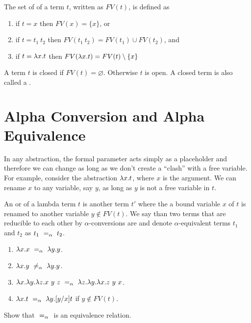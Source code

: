 \begin{definition}
\label{def:lce::fv}
The set of  of a term $t$, written as $FV(t)$,
is defined as 
\begin{enumerate}
\item if $t = x$ then $FV(x) = \{ x \}$, or
\item if $t = t_1~t_2$ then $FV(t_1~t_2)=FV(t_1) \cup FV(t_2)$, and
\item if $t = \lambda x. t$ then $FV(\lambda x.t)=FV(t) \setminus \{x\}$
\end{enumerate}
\end{definition}

\begin{definition}
\label{def:lce::open-closed}
A term $t$ is closed if $FV(t) = \varnothing$. Otherwise $t$ is open. 
A closed term is also called a .
\end{definition}


\section{Alpha Conversion and Alpha Equivalence}
\label{sec:lce::alpha}
In any abstraction, the formal parameter acts simply as a placeholder and therefore we can change as long as we don't create a ``clash'' with a free variable.
%
For example, consider the abstraction $\lambda x.t$, where $x$ is the argument. We can rename $x$ to any variable, say $y$, as long as $y$ is not a free variable in $t$.
%

\begin{flex}
\begin{definition}
\label{def:lce::alpha}
An  or  of a lambda
term $t$ is
%
another term $t'$ where the a bound variable $x$ of $t$ is renamed to another variable $y \not\in FV(t)$.
%
We say than two terms that are reducible to each other by $\alpha$-conversions are 
%
and
%
denote $\alpha$-equivalent terms $t_1$ and
$t_2$ as $t_1 ~=_{\alpha}~ t_2$.
\end{definition}

\begin{example}
\begin{enumerate}
\item $\lambda x.x ~=_{\alpha}~ \lambda y.y$. 
\item $\lambda x.y ~\neq_{\alpha}~ \lambda y.y$. 
\item $\lambda x. \lambda y. \lambda z. x ~y~z ~=_{\alpha}~ \lambda z. \lambda y. \lambda x. z~y~x$.
\item $\lambda x.t ~=_{\alpha}~ \lambda y.[y/x]t$ if  $y \not\in FV(t)$.
\end{enumerate}
\end{example}
\end{flex}

\begin{exercise}
\label{xrcs::alphha-eq-is-eq}
Show that $~=_{\alpha}~$ is an equivalence relation.
\end{exercise}


